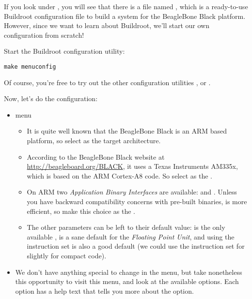 If you look under , you will see that there is a file
named , which is a ready-to-use Buildroot
configuration file to build a system for the BeagleBone Black
platform. However, since we want to learn about Buildroot, we'll start
our own configuration from scratch!

Start the Buildroot configuration utility:

\begin{verbatim}
make menuconfig
\end{verbatim}

Of course, you're free to try out the other configuration utilities
,  or .

Now, let's do the configuration:

\begin{itemize}

\item {} menu

  \begin{itemize}

  \item It is quite well known that the BeagleBone Black is an ARM based
    platform, so select  as the target
    architecture.

  \item According to the BeagleBone Black website at
    \url{http://beagleboard.org/BLACK}, it uses a Texas Instruments
    AM335x, which is based on the ARM Cortex-A8 code. So select
     as the .

  \item On ARM two {\em Application Binary Interfaces} are available:
     and . Unless you have backward
    compatibility concerns with pre-built binaries,  is
    more efficient, so make this choice as the .

  \item The other parameters can be left to their default value:
     is the only available ,
     is a sane default for the {\em Floating Point
      Unit}, and using the  instruction set is also a good
    default (we could use the  instruction set for
    slightly for compact code).

  \end{itemize}

\item We don't have anything special to change in the
   menu, but take nonetheless this opportunity to
  visit this menu, and look at the available options. Each option has
  a help text that tells you more about the option.


\end{itemize}
